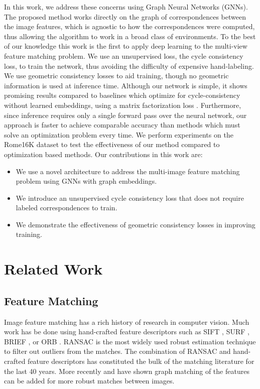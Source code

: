 \documentclass{article} %
\begin{document}
In this work, we address these concerns using Graph Neural Networks (GNNs).
The proposed method works directly on the graph of correspondences between the image features, which is agnostic to how the correspondences were computed, thus allowing the algorithm to work in a broad class of environments.
To the best of our knowledge this work is the first to apply deep learning to the multi-view feature matching problem.
We use an unsupervised loss, the cycle consistency loss, to train the network, thus avoiding the difficulty of expensive hand-labeling.
We use geometric consistency losses to aid training, though no geometric information is used at inference time.
Although our network is simple, it shows promising results compared to baselines which optimize for cycle-consistency without learned embeddings, using a matrix factorization loss \citep{zhou2015multi, leonardos2016distributed}.
Furthermore, since inference requires only a single forward pass over the neural network, our approach is faster to achieve comparable accuracy than methods which must solve an optimization problem every time.
We perform experiments on the Rome16K dataset \citep{li2010location} to test the effectiveness of our method compared to optimization based methods.
Our contributions in this work are:
\begin{itemize}
\item We use a novel architecture to address the multi-image feature matching problem using GNNs with graph embeddings.
\item We introduce an unsupervised cycle consistency loss that does not require labeled correspondences to train.
\item We demonstrate the effectiveness of geometric consistency losses in improving training.
\end{itemize}


\section{Related Work}

\subsection{Feature Matching}
Image feature matching has a rich history of research in computer vision.
Much work has be done using hand-crafted feature descriptors such as SIFT \citep{lowe2004distinctive}, SURF \citep{bay2006surf}, BRIEF \citep{calonder2012brief}, or ORB \citep{mur2015orb}.
RANSAC \cite{fischler1981random} is the most widely used robust estimation technique to filter out outliers from the matches.
The combination of RANSAC and hand-crafted feature descriptors has constituted the bulk of the matching literature for the last 40 years.
More recently \cite{suh2015subgraph} and \cite{hu2016distributable} have shown graph matching of the features can be added for more robust matches between images.
\end{document}
